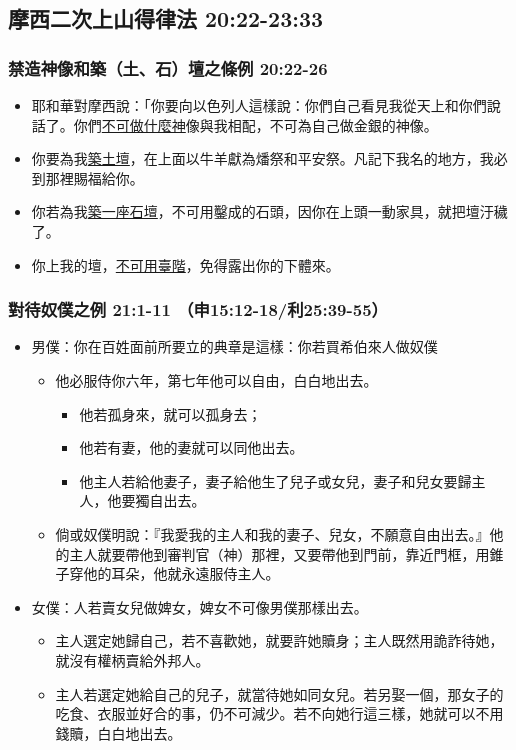 \subsection{摩西二次上山得律法 20:22-23:33}
\subsubsection{禁造神像和築（土、石）壇之條例 20:22-26}
\begin{itemize} 
\itemsep-.35em
\item 耶和華對摩西說：「你要向以色列人這樣說：你們自己看見我從天上和你們說話了。你們\underline{不可做什麼神}像與我相配，不可為自己做金銀的神像。
\item 你要為我\underline{築土壇}，在上面以牛羊獻為燔祭和平安祭。凡記下我名的地方，我必到那裡賜福給你。
 \item 你若為我\underline{築一座石壇}，不可用鑿成的石頭，因你在上頭一動家具，就把壇汙穢了。
\item 你上我的壇，\underline{不可用臺階}，免得露出你的下體來。
\end{itemize}


\subsubsection{對待奴僕之例 21:1-11 （申15:12-18/利25:39-55）}
\begin{itemize} 
\itemsep-.35em
\item 男僕：你在百姓面前所要立的典章是這樣：你若買希伯來人做奴僕
\begin{itemize} 
\itemsep-.35em
\item 他必服侍你六年，第七年他可以自由，白白地出去。
\begin{itemize} 
\itemsep-.35em
\item 他若孤身來，就可以孤身去；
\item 他若有妻，他的妻就可以同他出去。
\item 他主人若給他妻子，妻子給他生了兒子或女兒，妻子和兒女要歸主人，他要獨自出去。
\end{itemize}
\item 倘或奴僕明說：『我愛我的主人和我的妻子、兒女，不願意自由出去。』他的主人就要帶他到審判官（神）那裡，又要帶他到門前，靠近門框，用錐子穿他的耳朵，他就永遠服侍主人。
\end{itemize}
\item 女僕：人若賣女兒做婢女，婢女不可像男僕那樣出去。
\begin{itemize} 
\itemsep-.35em
\item 主人選定她歸自己，若不喜歡她，就要許她贖身；主人既然用詭詐待她，就沒有權柄賣給外邦人。
\item 主人若選定她給自己的兒子，就當待她如同女兒。若另娶一個，那女子的吃食、衣服並好合的事，仍不可減少。若不向她行這三樣，她就可以不用錢贖，白白地出去。
\end{itemize}
\end{itemize}

